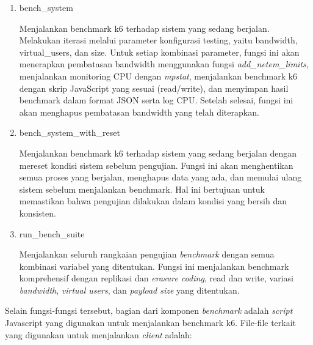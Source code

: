 \begin{enumerate}  
  \item bench\_system
  
  Menjalankan benchmark k6 terhadap sistem yang sedang berjalan. Melakukan iterasi melalui parameter konfigurasi testing, yaitu bandwidth, virtual\_users, dan size. Untuk setiap kombinasi parameter, fungsi ini akan menerapkan pembatasan bandwidth menggunakan fungsi \textit{add\_netem\_limits}, menjalankan monitoring CPU dengan \textit{mpstat}, menjalankan benchmark k6 dengan skrip JavaScript yang sesuai (read/write), dan menyimpan hasil benchmark dalam format JSON serta log CPU. Setelah selesai, fungsi ini akan menghapus pembatasan bandwidth yang telah diterapkan.

  \item bench\_system\_with\_reset

  Menjalankan benchmark k6 terhadap sistem yang sedang berjalan dengan mereset kondisi sistem sebelum pengujian. Fungsi ini akan menghentikan semua proses yang berjalan, menghapus data yang ada, dan memulai ulang sistem sebelum menjalankan benchmark. Hal ini bertujuan untuk memastikan bahwa pengujian dilakukan dalam kondisi yang bersih dan konsisten.
  
  \item run\_bench\_suite
  
  Menjalankan seluruh rangkaian pengujian \textit{benchmark} dengan semua kombinasi variabel yang ditentukan. Fungsi ini menjalankan benchmark komprehensif dengan replikasi dan \textit{erasure coding}, read dan write, variasi \textit{bandwidth}, \textit{virtual users}, dan \textit{payload size} yang ditentukan.
\end{enumerate}

Selain fungsi-fungsi tersebut, bagian dari komponen \textit{benchmark} adalah \textit{script} Javascript yang digunakan untuk menjalankan benchmark k6. File-file terkait yang digunakan untuk menjalankan \textit{client} adalah:

